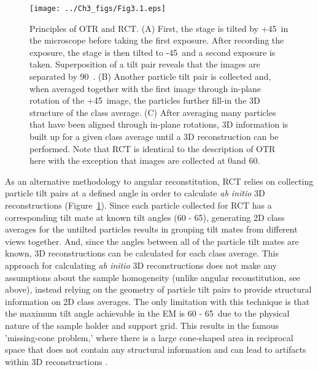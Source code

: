 \begin{figure}
\centering
\texttt{[image: ../Ch3\_figs/Fig3.1.eps]}
\caption[Principles of OTR and RCT]{Principles of OTR and RCT. (A) First, the stage is tilted by +45\textdegree\ in the microscope before taking the first exposure. After recording the exposure, the stage is then tilted to -45\textdegree\ and a second exposure is taken. Superposition of a tilt pair reveals that the images are separated by 90\textdegree\ . (B) Another particle tilt pair is collected and, when averaged together with the first image through in-plane rotation of the +45\textdegree\ image, the particles further fill-in the 3D structure of the class average.  (C) After averaging many particles that have been aligned through in-plane rotations, 3D information is built up for a given class average until a 3D reconstruction can be performed. Note that RCT is identical to the description of OTR here with the exception that images are collected at 0\textdegree and 60\textdegree.}    
\label{fig:Fig3.1}
\end{figure}
\indent As an alternative methodology to angular reconstitution, RCT relies on collecting particle tilt pairs at a defined angle in order to calculate \emph{ab initio} 3D reconstructions \cite{Radermacher_1987} (Figure~\ref{fig:Fig3.1}). Since each particle collected for RCT has a corresponding tilt mate at known tilt angles (60 - 65\textdegree), generating 2D class averages for the untilted particles results in grouping tilt mates from different views together. And, since the angles between all of the particle tilt mates are known, 3D reconstructions can be calculated for each class average. This approach for calculating \emph{ab initio} 3D reconstructions does not make any assumptions about the sample homogeneity (unlike angular reconstitution, see above), instead relying on the geometry of particle tilt pairs to provide structural information on 2D class averages. The only limitation with this technique is that the maximum tilt angle achievable in the EM is 60 - 65\textdegree\ due to the physical nature of the sample holder and support grid. This results in the famous 'missing-cone problem,' where there is a large cone-shaped area in reciprocal space that does not contain any structural information and can lead to artifacts within 3D reconstructions \cite{Frank_1996}.\\ 
